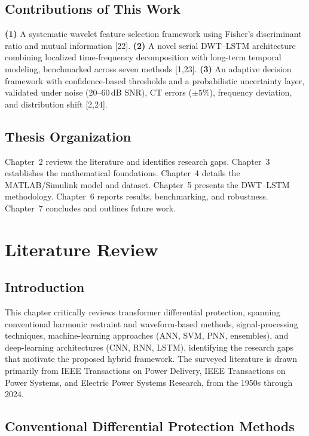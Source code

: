 \documentclass[12pt,a4paper,oneside]{report}
\begin{document}
\section{Contributions of This Work}
\textbf{(1)} A systematic wavelet feature-selection framework using Fisher's discriminant ratio and mutual information [22]. \textbf{(2)} A novel serial DWT--LSTM architecture combining localized time-frequency decomposition with long-term temporal modeling, benchmarked across seven methods [1,23]. \textbf{(3)} An adaptive decision framework with confidence-based thresholds and a probabilistic uncertainty layer, validated under noise (20--60\,dB SNR), CT errors ($\pm5\%$), frequency deviation, and distribution shift [2,24].

\section{Thesis Organization}
Chapter~2 reviews the literature and identifies research gaps. Chapter~3 establishes the mathematical foundations. Chapter~4 details the MATLAB/Simulink model and dataset. Chapter~5 presents the DWT--LSTM methodology. Chapter~6 reports results, benchmarking, and robustness. Chapter~7 concludes and outlines future work.

\chapter{Literature Review}
\section{Introduction}
This chapter critically reviews transformer differential protection, spanning conventional harmonic restraint and waveform-based methods, signal-processing techniques, machine-learning approaches (ANN, SVM, PNN, ensembles), and deep-learning architectures (CNN, RNN, LSTM), identifying the research gaps that motivate the proposed hybrid framework. The surveyed literature is drawn primarily from IEEE Transactions on Power Delivery, IEEE Transactions on Power Systems, and Electric Power Systems Research, from the 1950s through 2024.

\section{Conventional Differential Protection Methods}
\end{document}
